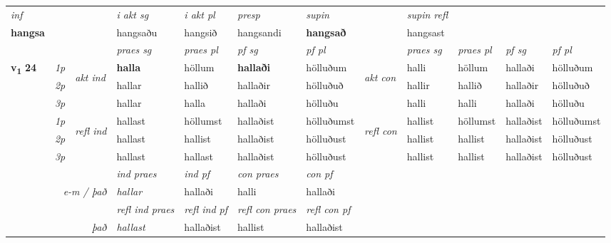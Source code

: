 \begin{longtable}[l]{X>{\footnotesize\itshape}llXXXXlXXXX}
   {\textit{inf}} & &  & \textit{i akt sg} & \textit{i akt pl}   & \textit{presp} & \textit{supin} && \textit{supin refl}  \\*
  {\textbf{hangsa}} & && hangsaðu  & hangsið   & hangsandi &  \textbf{hangsað} && hangsast  \\*

\midrule

 & &   & \textit{praes sg}  & \textit{praes pl}    & \textit{ pf sg} & \textit{pf pl} & & \textit{praes sg}  & \textit{praes pl}    & \textit{pf sg} & \textit{pf pl }  \\ \cmidrule{4-7} \cmidrule{9-12}
 \multirow{2}{*}{{{\textbf{v{\textsubscript{1}}} \Large{\textbf{24}}}}}  & 1p & \multirow{3}{*}{\begin{turn}{90}\textit{akt ind}\end{turn}} & \textbf{halla} & höllum & \textbf{hallaði} & hölluðum & \multirow{3}{*}{\begin{turn}{90}\textit{akt con}\end{turn}} &halli & höllum & hallaði & hölluðum\\*
 & 2p &  &  hallar  & hallið & hallaðir & hölluðuð & & hallir & hallið & hallaðir & hölluðuð \\*
 & 3p &  & hallar & halla & hallaði & hölluðu & & halli & halli& hallaði & hölluðu \\*
\cmidrule{4-7} \cmidrule{9-12}
 & 1p & \multirow{3}{*}{\begin{turn}{90}\textit{refl ind}\end{turn}}  & hallast & höllumst & hallaðist & hölluðumst & \multirow{3}{*}{\begin{turn}{90}\textit{refl con}\end{turn}}  &hallist & höllumst & hallaðist & hölluðumst \\*
 & 2p &  & hallast & hallist & hallaðist & hölluðust & &hallist & hallist & hallaðist & hölluðust \\*
 & 3p  & & hallast & hallast & hallaðist & hölluðust & & hallist & hallist& hallaðist & hölluðust \\*
\cmidrule{4-7} \cmidrule{9-12}

   && &  \textit{ind praes} & \textit{ind pf} & \textit{con praes} & \textit{con pf} \\*
\multicolumn{3}{r}{\textit{e-m / það}} & hallar & hallaði & halli & hallaði \\*

\cmidrule{4-7}
 & && \textit{refl ind praes} & \textit{refl ind pf} & \textit{refl con praes} & \textit{refl con pf} \\*
\multicolumn{3}{r}{\textit{það}}& hallast & hallaðist & hallist & hallaðist \\*


\end{longtable}

